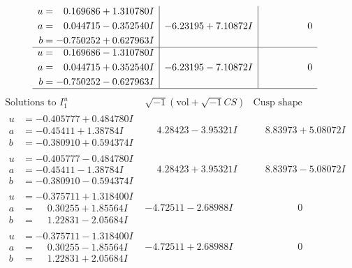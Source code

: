 \documentclass[1p]{elsarticle_modified}
\theoremstyle{definition}
\newcommand{\I}{\sqrt{-1}}
\begin{document}
$$\begin{array}{c|c|c}
\begin{aligned}
u &= \phantom{-}0.169686 + 1.310780 I \\
a &= \phantom{-}0.044715 - 0.352540 I \\
b &= -0.750252 + 0.627963 I\end{aligned}
 & -6.23195 + 7.10872 I & \phantom{-0.000000 } 0 \\ \hline\begin{aligned}
u &= \phantom{-}0.169686 - 1.310780 I \\
a &= \phantom{-}0.044715 + 0.352540 I \\
b &= -0.750252 - 0.627963 I\end{aligned}
 & -6.23195 - 7.10872 I & \phantom{-0.000000 } 0\\
 \hline 
 \end{array}$$\newpage$$\begin{array}{c|c|c}  
\text{Solutions to }I^u_{1}& \I (\text{vol} + \sqrt{-1}CS) & \text{Cusp shape}\\
 \hline 
\begin{aligned}
u &= -0.405777 + 0.484780 I \\
a &= -0.45411 + 1.38784 I \\
b &= -0.380910 + 0.594374 I\end{aligned}
 & \phantom{-}4.28423 - 3.95321 I & \phantom{-}8.83973 + 5.08072 I \\ \hline\begin{aligned}
u &= -0.405777 - 0.484780 I \\
a &= -0.45411 - 1.38784 I \\
b &= -0.380910 - 0.594374 I\end{aligned}
 & \phantom{-}4.28423 + 3.95321 I & \phantom{-}8.83973 - 5.08072 I \\ \hline\begin{aligned}
u &= -0.375711 + 1.318400 I \\
a &= \phantom{-}0.30255 + 1.85564 I \\
b &= \phantom{-}1.22831 - 2.05684 I\end{aligned}
 & -4.72511 - 2.68988 I & \phantom{-0.000000 } 0 \\ \hline\begin{aligned}
u &= -0.375711 - 1.318400 I \\
a &= \phantom{-}0.30255 - 1.85564 I \\
b &= \phantom{-}1.22831 + 2.05684 I\end{aligned}
 & -4.72511 + 2.68988 I & \phantom{-0.000000 } 0 \\ \hline\begin{aligned}

\end{aligned}
\end{array}$$
\end{document}
